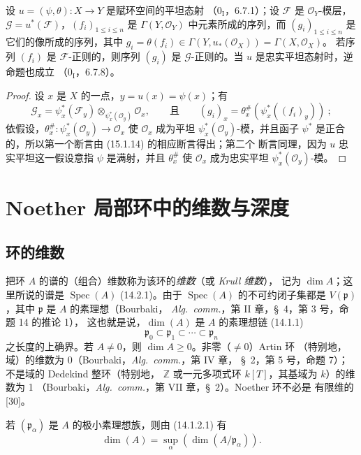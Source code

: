 \begin{proposition}[15.2.5]
\label{0.15.2.5-fr}
设 $u=(\psi,\theta):X\to Y$ 是赋环空间的平坦态射
（$0_{\mathrm I}$，6.7.1）；设 $\mathscr{F}$ 是 $\mathcal{O}_Y$-模层，
$\mathscr{G}=u^*(\mathscr{F})$，$(f_i)_{1\leq i\leq n}$ 是
$\Gamma(Y,\mathcal{O}_Y)$ 中元素所成的序列，而
$(g_i)_{1\leq i\leq n}$ 是它们的像所成的序列，其中
$g_i=\theta(f_i)\in\Gamma(Y,u_*(\mathcal{O}_X))=\Gamma(X,\mathcal{O}_X)$。
若序列 $(f_i)$ 是 $\mathscr{F}$-正则的，则序列 $(g_i)$ 是
$\mathscr{G}$-正则的。当 $u$ 是忠实平坦态射时，逆命题也成立
（$0_{\mathrm I}$，6.7.8）。
\end{proposition}

\begin{proof}
设 $x$ 是 $X$ 的一点，$y=u(x)=\psi(x)$；有
\[
  \mathscr{G}_x=\psi_x^*(\mathscr{F}_y)
  \otimes_{\psi_x^*(\mathcal{O}_y)}\mathcal{O}_x,
  \qquad\text{且}\qquad
  (g_i)_x=\theta_x^\#(\psi_x^*((f_i)_y))~;
\]
依假设，$\theta_x^\#:\psi_x^*(\mathcal{O}_y)\to\mathcal{O}_x$ 使
$\mathcal{O}_x$ 成为平坦 $\psi_x^*(\mathcal{O}_y)$-模，并且函子
$\psi^*$ 是正合的，所以第一个断言由 (15.1.14) 的相应断言得出；第二个
断言同理，因为 $u$ 忠实平坦这一假设意指 $\psi$ 是满射，并且
$\theta_x^\#$ 使 $\mathcal{O}_x$ 成为忠实平坦
$\psi_x^*(\mathcal{O}_y)$-模。
\end{proof}

\section{Noether 局部环中的维数与深度}
\label{section:0.16-fr}

\subsection{环的维数}
\label{subsection:0.16.1-fr}

\begin{env}[16.1.1]
\label{0.16.1.1-fr}
把环 $A$ 的谱的（组合）维数称为该环的\emph{维数}（或 \emph{Krull 维数}），
记为 $\dim A$；这里所说的谱是 $\operatorname{Spec}(A)$ (14.2.1)。由于
$\operatorname{Spec}(A)$ 的不可约闭子集都是
$V(\mathfrak{p})$，其中 $\mathfrak{p}$ 是 $A$ 的素理想（Bourbaki，
\emph{Alg.~comm.}，第 II 章，\S~4，第 3 号，命题 14 的推论 1），
这也就是说，$\dim(A)$ 是 $A$ 的素理想链 (14.1.1)
\[
  \mathfrak{p}_0\subset\mathfrak{p}_1\subset\cdots\subset\mathfrak{p}_n
\]
之长度的上确界。若 $A\neq0$，则 $\dim A\geq0$。非零（$\neq0$）Artin 环
（特别地，域）的维数为 0（Bourbaki，\emph{Alg.~comm.}，第 IV 章，
\S~2，第 5 号，命题 7）；不是域的 Dedekind 整环（特别地，
$\mathbb{Z}$ 或一元多项式环 $k[T]$，其基域为 $k$）的维数为 1
（Bourbaki，\emph{Alg.~comm.}，第 VII 章，\S~2）。Noether 环不必是
有限维的 [30]。

若 $(\mathfrak{p}_\alpha)$ 是 $A$ 的极小素理想族，则由 (14.1.2.1) 有
\[
\label{0.16.1.1.1-fr}
  \dim(A)=\sup_\alpha(\dim(A/\mathfrak{p}_\alpha)).
\tag{16.1.1.1}
\]
\end{env}

